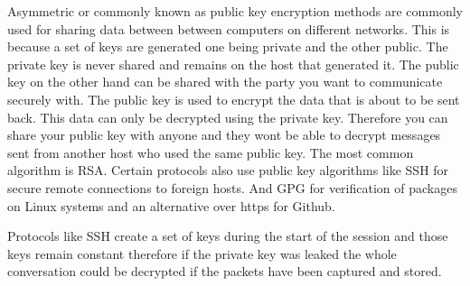 Asymmetric or commonly known as public key encryption methods are commonly used for sharing data between between computers on different networks. This is because a set of keys are generated one being private and the other public. The private key is never shared and remains on the host that generated it. The public key on the other hand can be shared with the party you want to communicate securely with. The public key is used to encrypt the data that is about to be sent back. This data can only be decrypted using the private key. Therefore you can share your public key with anyone and they wont be able to decrypt messages sent from another host who used the same public key. The most common algorithm is RSA. Certain protocols also use public key algorithms like SSH for secure remote connections to foreign hosts. And GPG for verification of packages on Linux systems and an alternative over https for Github.

Protocols like SSH create a set of keys during the start of the session and those keys remain constant therefore if the private key was leaked the whole conversation could be decrypted if the packets have been captured and stored.  

